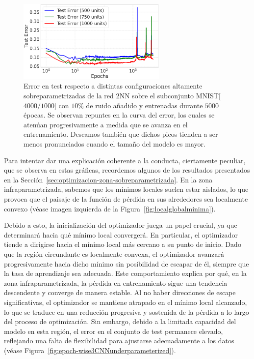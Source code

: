\begin{figure}[h!]
    \centering
    \includegraphics[width=0.65\textwidth]{img/experiments/epoch-wiseMNIST.png}
    \caption[Error en test respecto a distintas configuraciones altamente sobreparametrizadas de la red $2$NN.]{Error en test respecto a distintas configuraciones altamente sobreparametrizadas de la red $2$NN sobre el subconjunto MNIST[$4000/1000$] con $10$\% de ruido añadido y entrenadas durante $5000$ épocas. Se observan repuntes en la curva del error, los cuales se atenúan progresivamente a medida que se avanza en el entrenamiento. Descamos también que dichos picos tienden a ser menos pronunciados cuando el tamaño del modelo es mayor.}\label{fig:epoch-wiseMNIST}
\end{figure}

Para intentar dar una explicación coherente a la conducta, ciertamente peculiar, que se observa en estas gráficas, recordemos algunos de los resultados presentados en la Sección~\ref{sec:optimizacion-zona-sobreparametrizada}. En la zona infraparametrizada, sabemos que los mínimos locales suelen estar aislados, lo que provoca que el paisaje de la función de pérdida en sus alrededores sea localmente convexo (véase imagen izquierda de la Figura~\ref{fig:localglobalminima}).

Debido a esto, la inicialización del optimizador juega un papel crucial, ya que determinará hacia qué mínimo local convergerá. En particular, el optimizador tiende a dirigirse hacia el mínimo local más cercano a su punto de inicio. Dado que la región circundante es localmente convexa, el optimizador avanzará progresivamente hacia dicho mínimo sin posibilidad de escapar de él, siempre que la tasa de aprendizaje sea adecuada. Este comportamiento explica por qué, en la zona infraparametrizada, la pérdida en entrenamiento sigue una tendencia descendente y converge de manera estable. Al no haber direcciones de escape significativas, el optimizador se mantiene atrapado en el mínimo local alcanzado, lo que se traduce en una reducción progresiva y sostenida de la pérdida a lo largo del proceso de optimización. Sin embargo, debido a la limitada capacidad del modelo en esta región, el error en el conjunto de test permanece elevado, reflejando una falta de flexibilidad para ajustarse adecuadamente a los datos (véase Figura~\ref{fig:epoch-wise3CNNunderparameterized}).

